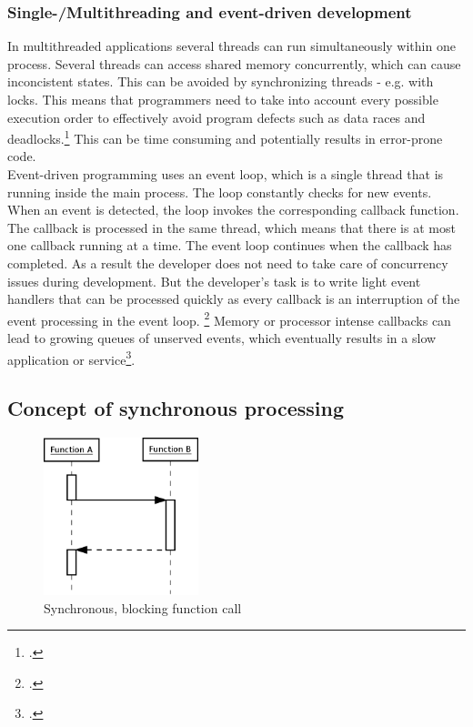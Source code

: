 \subsubsection{Single-/Multithreading and event-driven development}
\label{issue_threads}

In multithreaded applications several threads can run simultaneously within one 
process. Several threads can access shared memory concurrently, which can
cause inconcistent states. This can be avoided by synchronizing threads - e.g.
with locks. This means that programmers need to take into account every possible
execution order to effectively avoid program defects such as data races and 
deadlocks.\footcite[Cf.][10]{Breshears_2009}
This can be time consuming and potentially results in error-prone code.\\

Event-driven programming uses an event loop, which is a single thread that is
running inside the main process.
The loop constantly checks for new events. When an event is detected, the loop
invokes the corresponding callback function. The callback is processed in the
same thread, which means that there is at most one callback running at a time.
The event loop continues when the callback has completed. As a result the
developer does not need to take care of concurrency issues during development.
But the developer's task is to write light event handlers that can be processed
quickly as every callback is an interruption of the event processing in the
event loop. \footcite[Cf.][]{Croucher_2010} Memory or processor intense callbacks
can lead to growing queues of unserved events, which eventually results
in a slow application or service\footcite[Cf.][48]{teixeira_2012}.

\subsection{Concept of synchronous processing}
\label{concept_sync}
\FloatBarrier

\begin{figure}[hbtp]
\centering
\includegraphics[width=0.4\textwidth]{img/synch_call.png}
\caption{Synchronous, blocking function call}
\label{fig:asynch_call}
\end{figure}

